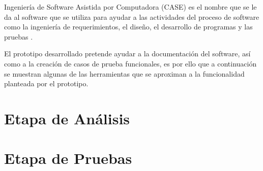 Ingeniería de Software Asistida por Computadora (CASE) es el nombre que se le da al software que se utiliza para ayudar a las actividades del proceso de software como la ingeniería de requerimientos, el diseño, el desarrollo de programas y las pruebas \cite{sommerville1992software}. 

El prototipo desarrollado pretende ayudar a la documentación del software, así como a la creación de casos de prueba funcionales, es por ello que a continuación se muestran algunas de las herramientas que se aproximan a la funcionalidad planteada por el prototipo.

\section{Etapa de Análisis}

\section{Etapa de Pruebas}
